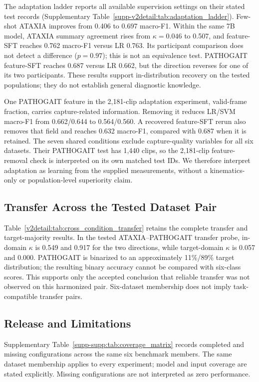 The adaptation ladder reports all available supervision settings on their stated test records (Supplementary Table~\ref{supp-v2detail:tab:adaptation_ladder}). Few-shot ATAXIA improves from 0.406 to 0.697 macro-F1. Within the same 7B model, ATAXIA summary agreement rises from $\kappa=0.046$ to 0.507, and feature-SFT reaches 0.762 macro-F1 versus LR 0.763. Its participant comparison does not detect a difference ($p=0.97$); this is not an equivalence test. PATHOGAIT feature-SFT reaches 0.687 versus LR 0.662, but the direction reverses for one of its two participants. These results support in-distribution recovery on the tested populations; they do not establish general diagnostic knowledge.

One PATHOGAIT feature in the 2,181-clip adaptation experiment, valid-frame fraction, carries capture-related information. Removing it reduces LR/SVM macro-F1 from 0.662/0.644 to 0.564/0.560. A recovered feature-SFT rerun also removes that field and reaches 0.632 macro-F1, compared with 0.687 when it is retained. The seven shared conditions exclude capture-quality variables for all six datasets. Their PATHOGAIT test has 1,440 clips, so the 2,181-clip feature-removal check is interpreted on its own matched test IDs. We therefore interpret adaptation as learning from the supplied measurements, without a kinematics-only or population-level superiority claim.



\subsection{Transfer Across the Tested Dataset Pair}
\label{sec:transfer}
Table~\ref{v2detail:tab:cross_condition_transfer} retains the complete transfer and target-majority results. In the tested ATAXIA--PATHOGAIT transfer probe, in-domain $\kappa$ is 0.549 and 0.917 for the two directions, while target-domain $\kappa$ is 0.057 and 0.000. PATHOGAIT is binarized to an approximately 11\%/89\% target distribution; the resulting binary accuracy cannot be compared with six-class scores. This supports only the accepted conclusion that reliable transfer was not observed on this harmonized pair. Six-dataset membership does not imply task-compatible transfer pairs.

\subsection{Release and Limitations}
\label{sec:release}
Supplementary Table~\ref{supp-supp:tab:coverage_matrix} records completed and missing configurations across the same six benchmark members. The same dataset membership applies to every experiment; model and input coverage are stated explicitly. Missing configurations are not interpreted as zero performance.


